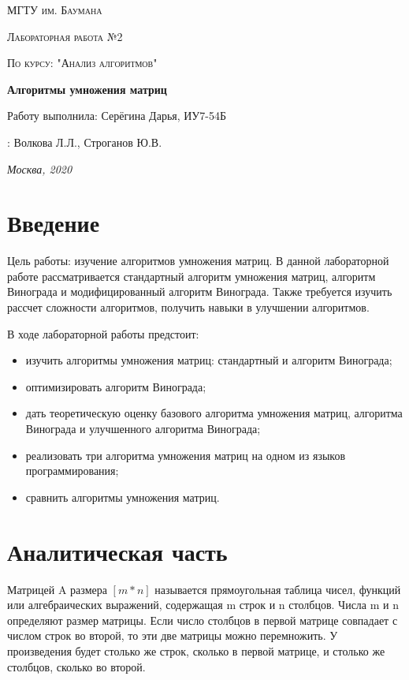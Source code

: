 \documentclass[12pt]{report}
\begin{document}
\begin{titlepage}
	\centering
	{\scshape\LARGE МГТУ им. Баумана \par}
	\vspace{3cm}
	{\scshape\Large Лабораторная работа №2\par}
	\vspace{0.5cm}	
	{\scshape\Large По курсу: "Анализ алгоритмов"\par}
	\vspace{1.5cm}
	{\huge\bfseries Алгоритмы умножения матриц\par}
	\vspace{2cm}
	\Large Работу выполнила: Серёгина Дарья, ИУ7-54Б\par
	\vspace{0.5cm}
	:  Волкова Л.Л., Строганов Ю.В.\par

	\vfill
	\large \textit {Москва, 2020} \par
\end{titlepage}

\tableofcontents

\newpage
\chapter*{Введение}
Цель работы: изучение алгоритмов умножения матриц. В данной лабораторной работе рассматривается стандартный алгоритм умножения матриц, алгоритм Винограда и модифицированный алгоритм Винограда.  Также требуется изучить рассчет сложности алгоритмов, получить навыки в улучшении алгоритмов.


В ходе лабораторной работы предстоит:
\begin{itemize}
	\item изучить алгоритмы умножения матриц: стандартный и алгоритм Винограда; 
	\item оптимизировать алгоритм Винограда; 
	\item дать теоретическую оценку базового алгоритма умножения матриц, алгоритма Винограда и улучшенного алгоритма Винограда;
	\item реализовать три алгоритма умножения матриц на одном из языков программирования;  
	\item сравнить алгоритмы умножения матриц.
\end{itemize}



\chapter{Аналитическая часть}
Матрицей A размера $[m*n]$ называется прямоугольная таблица
чисел, функций или алгебраических выражений, содержащая m строк и n столбцов. Числа m и n определяют размер матрицы.\cite{Beloysov} Если число столбцов в первой матрице совпадает с числом строк во второй, то эти две матрицы можно перемножить. У произведения будет столько же строк, сколько в первой матрице, и столько же столбцов, сколько во второй.
	    
\end{document}
